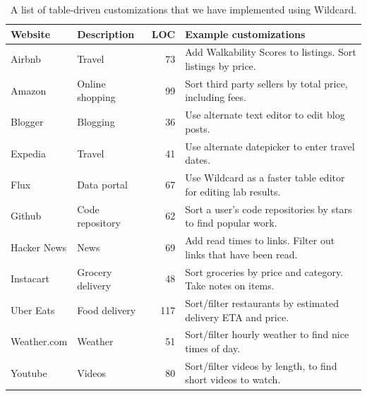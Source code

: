 \documentclass[sigplan,screen,10pt,anonymous,review]{acmart}
\begin{document}
\begin{table}[]
\begin{tabular}{llrl}
\hline
\textbf{Website} & \textbf{Description} & \textbf{LOC} & \textbf{Example customizations}                                                              \\ \hline
Airbnb           & Travel               & 73                                       & Add Walkability Scores to listings. Sort listings by price.                           \\
Amazon           & Online shopping      & 99                                       & Sort third party sellers by total price, including fees.                                \\
Blogger          & Blogging             & 36                                       & Use alternate text editor to edit blog posts.                                                 \\
Expedia          & Travel               & 41                                       & Use alternate datepicker to enter travel dates.                                               \\
Flux             & Data portal          & 67                                       & Use Wildcard as a faster table editor for editing lab results.                                \\
Github           & Code repository      & 62                                       & Sort a user's code repositories by stars to find popular work.                                \\
Hacker News      & News                 & 69                                       & Add read times to links. Filter out links that have been read. \\
Instacart        & Grocery delivery     & 48                                       & Sort groceries by price and category. Take notes on items.                                   \\
Uber Eats        & Food delivery        & 117                                      & Sort/filter restaurants by estimated delivery ETA and price.                                 \\
Weather.com  & Weather              & 51                                       & Sort/filter hourly weather to find nice times of day.                                        \\
Youtube          & Videos               & 80                                       & Sort/filter videos by length, to find short videos to watch.                                 \\ \hline
\end{tabular}
\caption{A list of table-driven customizations that we have implemented using Wildcard.}
\label{tab:websites}
\end{table}
\end{document}
